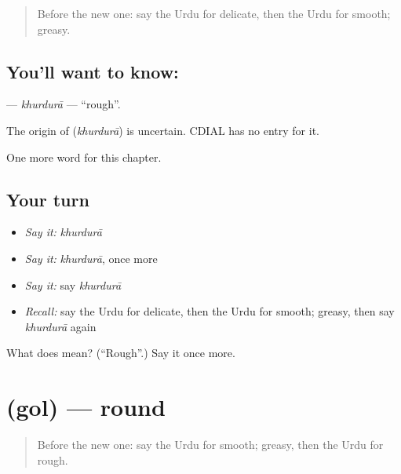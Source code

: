 \label{lesson:UR-C161-khurdura}



\begin{quote}
Before the new one: say the Urdu for delicate, then the Urdu for smooth; greasy.
\end{quote}

\subsection*{You'll want to know: }
\textbf{} — \emph{khurdurā} — \textquotedblleft{}rough\textquotedblright{}.

\begin{cousinweb}
The origin of \textbf{} (\emph{khurdurā}) is uncertain. CDIAL has no entry for it.
\end{cousinweb}

\begin{grammarlens}[title={What you've built}]
One more word for this chapter.
\end{grammarlens}

\subsection*{Your turn}
\begin{itemize}
\raggedright
  \item \emph{Say it:} \emph{khurdurā}
  \item \emph{Say it:} \emph{khurdurā}, once more
  \item \emph{Say it:} say \emph{khurdurā}
  \item \emph{Recall:} say the Urdu for delicate, then the Urdu for smooth; greasy, then say \emph{khurdurā} again
\end{itemize}

\begin{tcolorbox}[breakable,colback=teal!4,colframe=teal!35!black,title={Before you move on}]
What does  mean? (\textquotedblleft{}Rough\textquotedblright{}.) Say it once more.
\end{tcolorbox}
\section[\texorpdfstring{\ur{گول} (gol)}{گول (gol)}]{ (gol) — round}

\label{lesson:UR-C161-gol}



\begin{quote}
Before the new one: say the Urdu for smooth; greasy, then the Urdu for rough.
\end{quote}

